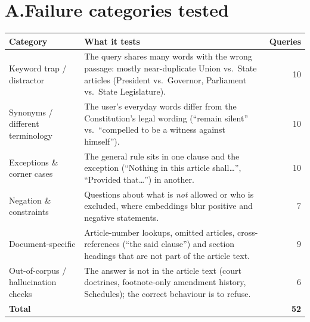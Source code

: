\documentclass[10pt,a4paper]{article}
\begin{document}
\section*{A.\quad Failure categories tested}
\begin{center}\small\begin{tabularx}{\linewidth}{@{}p{4.3cm}Yr@{}}\toprule
Category & What it tests & Queries\\\midrule
Keyword trap / distractor & The query shares many words with the wrong passage: mostly near-duplicate Union vs.\ State articles (President vs.\ Governor, Parliament vs.\ State Legislature). & 10\\
Synonyms / different terminology & The user's everyday words differ from the Constitution's legal wording (``remain silent'' vs.\ ``compelled to be a witness against himself''). & 10\\
Exceptions \& corner cases & The general rule sits in one clause and the exception (``Nothing in this article shall\ldots'', ``Provided that\ldots'') in another. & 10\\
Negation \& constraints & Questions about what is \emph{not} allowed or who is excluded, where embeddings blur positive and negative statements. & 7\\
Document-specific & Article-number lookups, omitted articles, cross-references (``the said clause'') and section headings that are not part of the article text. & 9\\
Out-of-corpus / hallucination checks & The answer is not in the article text (court doctrines, footnote-only amendment history, Schedules); the correct behaviour is to refuse. & 6\\
\midrule\textbf{Total} & & \textbf{52}\\\bottomrule
\end{tabularx}\end{center}
\end{document}
